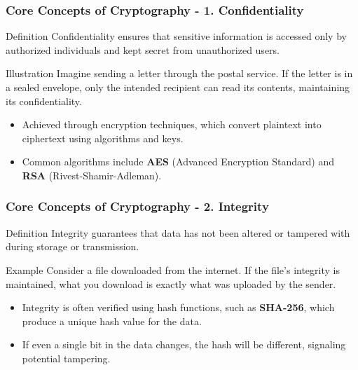 \documentclass{beamer}
\begin{document}
\begin{frame}[fragile]
    \frametitle{Core Concepts of Cryptography - 1. Confidentiality}
    \begin{block}{Definition}
        Confidentiality ensures that sensitive information is accessed only by authorized individuals and kept secret from unauthorized users.
    \end{block}
    
    \begin{block}{Illustration}
        Imagine sending a letter through the postal service. If the letter is in a sealed envelope, only the intended recipient can read its contents, maintaining its confidentiality.
    \end{block}
    
    \begin{itemize}
        \item Achieved through encryption techniques, which convert plaintext into ciphertext using algorithms and keys.
        \item Common algorithms include \textbf{AES} (Advanced Encryption Standard) and \textbf{RSA} (Rivest-Shamir-Adleman).
    \end{itemize}
\end{frame}

\begin{frame}[fragile]
    \frametitle{Core Concepts of Cryptography - 2. Integrity}
    \begin{block}{Definition}
        Integrity guarantees that data has not been altered or tampered with during storage or transmission.
    \end{block}
    
    \begin{block}{Example}
        Consider a file downloaded from the internet. If the file's integrity is maintained, what you download is exactly what was uploaded by the sender.
    \end{block}
    
    \begin{itemize}
        \item Integrity is often verified using hash functions, such as \textbf{SHA-256}, which produce a unique hash value for the data.
        \item If even a single bit in the data changes, the hash will be different, signaling potential tampering.
    \end{itemize}
\end{frame}
\end{document}
